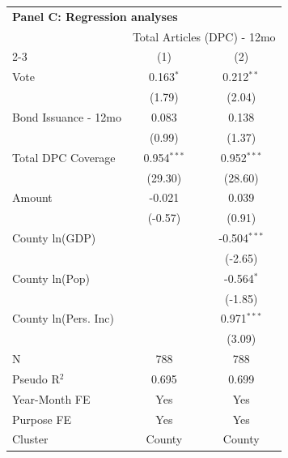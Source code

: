 \begingroup
\centering
\begin{tabular*}{\textwidth}{@{\extracolsep{\fill}}lcc}
\multicolumn{3}{l}{\textbf{Panel C: Regression analyses}}\\

\addlinespace
   \toprule
    & \multicolumn{2}{c}{Total Articles (DPC) - 12mo}\\
   \cmidrule(lr){2-3}
                        & (1)           & (2)\\  
   \midrule 
   Vote                 & 0.163$^{*}$   & 0.212$^{**}$\\   
                        & (1.79)        & (2.04)\\   
   Bond Issuance - 12mo & 0.083         & 0.138\\   
                        & (0.99)       & (1.37)\\   
   Total DPC Coverage   & 0.954$^{***}$ & 0.952$^{***}$\\   
                        & (29.30)        & (28.60)\\   
   Amount               & -0.021        & 0.039\\   
                        & (-0.57)      & (0.91)\\   
   County ln(GDP)       &               & -0.504$^{***}$\\   
                        &               & (-2.65)\\   
   County ln(Pop)       &               & -0.564$^{*}$\\   
                        &               & (-1.85)\\   
   County ln(Pers. Inc) &               & 0.971$^{***}$\\   
                        &               & (3.09)\\   
   \hline
   N         & 788           & 788\\  
   Pseudo R$^2$         & 0.695         & 0.699\\  
   Year-Month FE        & Yes           & Yes\\  
   Purpose FE           & Yes           & Yes\\  
   Cluster              & County & County\\  
   \bottomrule
\end{tabular*}
\par\endgroup
